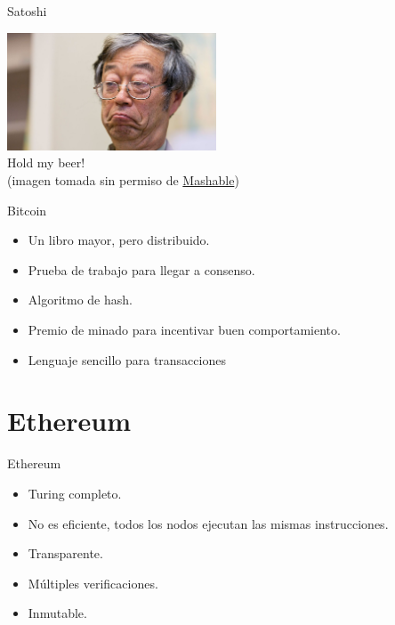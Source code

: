 \documentclass[10pt]{beamer}
\begin{document}
\begin{frame}{Satoshi}

  \begin{center}
    \includegraphics[height=3.5cm]{images/satoshi.jpg}
    \\ Hold my beer!
    \\ (imagen tomada sin permiso de \href{https://mashable.com/2014/03/07/dorian-nakamoto-bitcoin}{Mashable})
  \end{center}
  
\end{frame}

\begin{frame}{Bitcoin}

  \begin{itemize}
    \item Un libro mayor, pero distribuido.
    \item Prueba de trabajo para llegar a consenso.
    \item Algoritmo de hash.
    \item Premio de minado para incentivar buen comportamiento.
    \item Lenguaje sencillo para transacciones
  \end{itemize}
  
\end{frame}

\section{Ethereum}

\begin{frame}{Ethereum}

  \begin{itemize}
    \item Turing completo.
    \item No es eficiente, todos los nodos ejecutan las mismas instrucciones.
    \item Transparente.
    \item Múltiples verificaciones.
    \item Inmutable.
  \end{itemize}
  
\end{frame}
\end{document}
